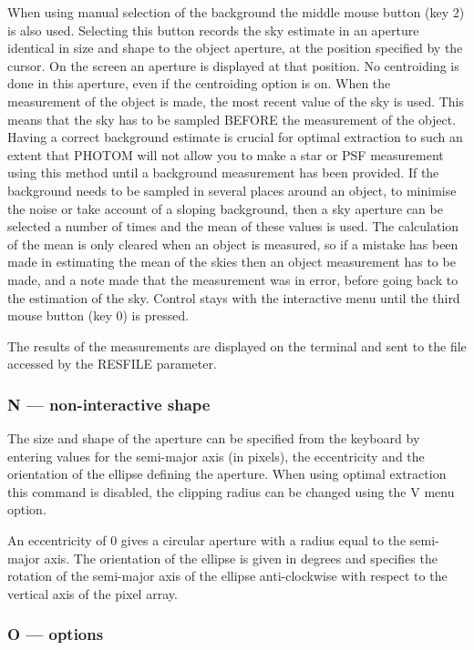 \documentclass[twoside,11pt]{article}
\renewcommand{\_}{\texttt{\symbol{95}}}
\begin{document}
When using manual selection of the background the middle mouse button
(key 2) is also used. Selecting this button records the sky estimate
in an aperture identical in size and shape to the object aperture, at
the position specified by the cursor. On the screen an aperture is
displayed at that position. No centroiding is done in this aperture,
even if the centroiding option is on. When the measurement of the
object is made, the most recent value of the sky is used. This means
that the sky has to be sampled BEFORE the measurement of the
object. Having a correct background estimate is crucial for optimal
extraction to such an extent that PHOTOM will not allow you to make a
star or PSF measurement using this method until a background measurement
has been provided. If the background needs to be sampled in several places around an object, to minimise the noise or take account of a sloping
background, then a sky aperture can be selected a number of times
and the mean of these values is used. The calculation of the
mean is only cleared when an object is measured, so if a mistake
has been made in estimating the mean of the skies then an object
measurement has to be made, and a note made that the measurement
was in error, before going back to the estimation of the sky. Control
stays with the interactive menu until the third mouse button (key 0)
is pressed.

The results of the measurements are displayed on the terminal and sent
to the file accessed by the RESFILE parameter.

\subsubsection{N --- non-interactive shape}

The size and shape of the aperture can be specified from the keyboard
by entering values for the semi-major axis (in pixels), the
eccentricity and the orientation of the ellipse defining the aperture.
When using optimal extraction this command is disabled, the clipping radius
can be changed using the V menu option.

An eccentricity of 0 gives a circular aperture with a radius equal
to the semi-major axis. The orientation of the ellipse is given in
degrees and specifies the rotation of the semi-major axis of the
ellipse anti-clockwise with respect to the vertical axis of the pixel
array.

\subsubsection{O --- options}
\end{document}
